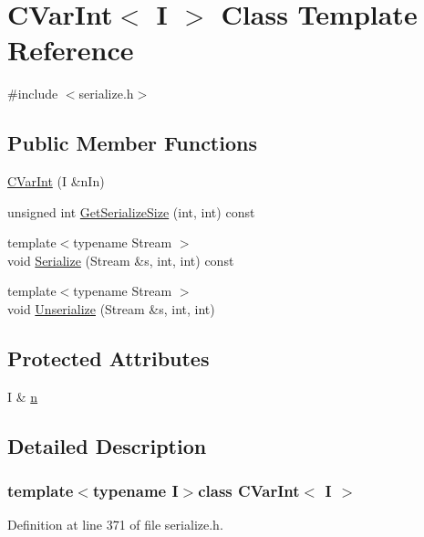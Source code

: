 \hypertarget{class_c_var_int}{}\section{C\+Var\+Int$<$ I $>$ Class Template Reference}
\label{class_c_var_int}


{\ttfamily \#include $<$serialize.\+h$>$}

\subsection*{Public Member Functions}
\begin{DoxyCompactItemize}
\item 
\hyperlink{class_c_var_int_ab26b9de1b43d4b9ce844eaa7cf6a6b4f}{C\+Var\+Int} (I \&n\+In)
\item 
unsigned int \hyperlink{class_c_var_int_a0fb5d15dfab5807439c1260096a10742}{Get\+Serialize\+Size} (int, int) const 
\item 
{\footnotesize template$<$typename Stream $>$ }\\void \hyperlink{class_c_var_int_ac9d49fe76d15de74952dfa1b1765d60d}{Serialize} (Stream \&s, int, int) const 
\item 
{\footnotesize template$<$typename Stream $>$ }\\void \hyperlink{class_c_var_int_aba87b78443378273b4f335dcd858c29c}{Unserialize} (Stream \&s, int, int)
\end{DoxyCompactItemize}
\subsection*{Protected Attributes}
\begin{DoxyCompactItemize}
\item 
I \& \hyperlink{class_c_var_int_a4514adc82b41754d9ac22ee627744614}{n}
\end{DoxyCompactItemize}


\subsection{Detailed Description}
\subsubsection*{template$<$typename I$>$class C\+Var\+Int$<$ I $>$}



Definition at line 371 of file serialize.\+h.



